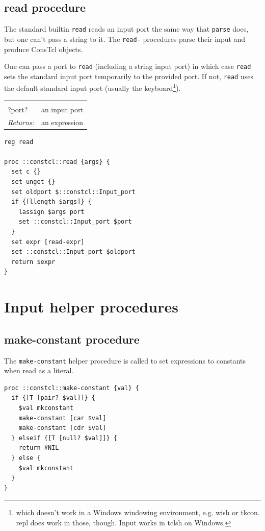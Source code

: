 \documentclass[twoside,9pt]{report}
\begin{document}
\subsection{read procedure}
\label{read-procedure}


The standard builtin \texttt{read} reads an input port the same way that \texttt{parse} does, but one can't pass a string to it. The \texttt{read-} procedures parse their input and produce ConsTcl objects.


One can pass a port to \texttt{read} (including a string input port) in which case \texttt{read} sets the standard input port temporarily to the provided port. If not, \texttt{read} uses the default standard input port (usually the keyboard\footnote{which doesn't work in a Windows windowing environment, e.g. wish or tkcon. repl does work in those, though. Input works in tclsh on Windows.}).

\noindent\begin{tabular}{ |p{1.9cm} p{8cm}| }
\hline
\rowcolor[HTML]{CCCCCC} \multicolumn{2}{|l|}{\bf read (public)} \\
?port? & an input port \\
\textit{Returns:} & an expression \\
\hline
\end{tabular}
\begin{lstlisting}
reg read

proc ::constcl::read {args} {
  set c {}
  set unget {}
  set oldport $::constcl::Input_port
  if {[llength $args]} {
    lassign $args port
    set ::constcl::Input_port $port
  }
  set expr [read-expr]
  set ::constcl::Input_port $oldport
  return $expr
}
\end{lstlisting}
\section{Input helper procedures}
\label{input-helper-procedures}
\subsection{make-constant procedure}
\label{make-constant-procedure}


The \texttt{make-constant} helper procedure is called to set expressions to constants when read as a literal.

\begin{lstlisting}
proc ::constcl::make-constant {val} {
  if {[T [pair? $val]]} {
    $val mkconstant
    make-constant [car $val]
    make-constant [cdr $val]
  } elseif {[T [null? $val]]} {
    return #NIL
  } else {
    $val mkconstant
  }
}
\end{lstlisting}
\end{document}
